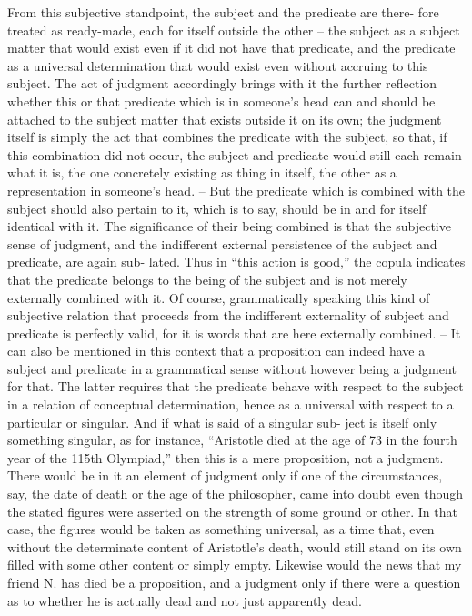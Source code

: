 From this subjective standpoint, the subject and the predicate are there-
fore treated as ready-made, each for itself outside the other – the subject as
a subject matter that would exist even if it did not have that predicate, and
the predicate as a universal determination that would exist even without
accruing to this subject. The act of judgment accordingly brings with it
the further reflection whether this or that predicate which is in someone’s
head can and should be attached to the subject matter that exists outside it
on its own; the judgment itself is simply the act that combines the predicate
with the subject, so that, if this combination did not occur, the subject
and predicate would still each remain what it is, the one concretely existing
as thing in itself, the other as a representation in someone’s head. – But
the predicate which is combined with the subject should also pertain to it,
which is to say, should be in and for itself identical with it. The significance
of their being combined is that the subjective sense of judgment, and the
indifferent external persistence of the subject and predicate, are again sub-
lated. Thus in “this action is good,” the copula indicates that the predicate
belongs to the being of the subject and is not merely externally combined
with it. Of course, grammatically speaking this kind of subjective relation
that proceeds from the indifferent externality of subject and predicate is
perfectly valid, for it is words that are here externally combined. – It can also
be mentioned in this context that a proposition can indeed have a subject
and predicate in a grammatical sense without however being a judgment
for that. The latter requires that the predicate behave with respect to the
subject in a relation of conceptual determination, hence as a universal with
respect to a particular or singular. And if what is said of a singular sub-
ject is itself only something singular, as for instance, “Aristotle died at the
age of 73 in the fourth year of the 115th Olympiad,” then this is a mere
proposition, not a judgment. There would be in it an element of judgment
only if one of the circumstances, say, the date of death or the age of the
philosopher, came into doubt even though the stated figures were asserted
on the strength of some ground or other. In that case, the figures would be
taken as something universal, as a time that, even without the determinate
content of Aristotle’s death, would still stand on its own filled with some
other content or simply empty. Likewise would the news that my friend
N. has died be a proposition, and a judgment only if there were a question
as to whether he is actually dead and not just apparently dead.

